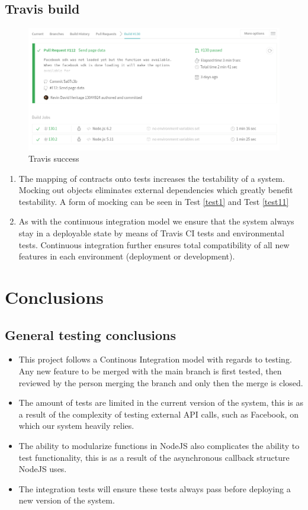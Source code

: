 \documentclass{article}
\begin{document}
	\subsection{Travis build}
	\begin{figure}[H]
	\includegraphics[width=15cm]{images/Travis.png}
	\caption{Travis success }
	\end{figure}	
	
\begin{enumerate}
	\item The mapping of contracts onto tests increases the testability of a system. Mocking out objects eliminates external dependencies which greatly benefit testability. A form of mocking can be seen in Test \ref{test1} and Test \ref{test11}
	\item As with the continuous integration model we ensure that the system always stay in a deployable state by means of Travis CI tests and environmental tests. Continuous integration further ensures total compatibility of all new features in each environment (deployment or development).
\end{enumerate}

\pagebreak
\section{Conclusions}
\subsection{General testing conclusions}
\begin{itemize}
\item This project follows a Continous Integration model with regards to testing. Any new feature to be merged with the main branch is first tested, then reviewed by the person merging the branch and only then the merge is closed.

\item  The amount of tests are limited in the current version of the system, this is as a result of the complexity of testing external API calls, such as Facebook, on which our system heavily relies.


\item The ability to modularize functions in NodeJS also complicates the ability to test functionality, this is as a result of the asynchronous callback structure NodeJS uses. 
\item The integration tests will ensure these tests always pass before deploying a new version of the system.
\end{itemize}
\end{document}
